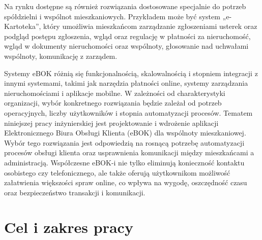 Na rynku dostępne są również rozwiązania dostosowane specjalnie do potrzeb spółdzielni i wspólnot mieszkaniowych. Przykładem może być system „e-Kartoteka”, który umożliwia mieszkańcom zarządzanie zgłoszeniami usterek oraz podgląd postępu zgłoszenia, wgląd oraz regulację w płatności za nieruchomość, wgląd w dokumenty nieruchomości oraz wspólnoty, głosowanie nad uchwałami wspólnoty, komunikację z zarządem. 

Systemy eBOK różnią się funkcjonalnością, skalowalnością i stopniem integracji z innymi systemami, takimi jak narzędzia płatności online, systemy zarządzania nieruchomościami i aplikacje mobilne. W zależności od charakterystyki organizacji, wybór konkretnego rozwiązania będzie zależał od potrzeb operacyjnych, liczby użytkowników i stopnia automatyzacji procesów.
% 
Tematem niniejszej pracy inżynierskiej jest projektowanie i wdrożenie aplikacji Elektronicznego Biura Obsługi Klienta (eBOK) dla wspólnoty mieszkaniowej. Wybór tego rozwiązania jest odpowiedzią na rosnącą potrzebę automatyzacji procesów obsługi klienta oraz usprawnienia komunikacji między mieszkańcami a administracją. Współczesne eBOK-i nie tylko eliminują konieczność kontaktu osobistego czy telefonicznego, ale także oferują użytkownikom możliwość załatwienia większości spraw online, co wpływa na wygodę, oszczędność czasu oraz bezpieczeństwo transakcji i komunikacji.



\section{Cel i zakres pracy}


